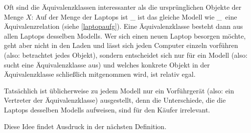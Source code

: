 \begin{bsp}
	Oft sind die Äquivalenzklassen interessanter als die ursprünglichen Objekte der Menge $X$: Auf der Menge der Laptops ist \glqq\_ ist das gleiche Modell wie \_\grqq\, eine Äquivalenzrelation (siehe \cref{laptopaufg}). Eine Äquivalenzklasse besteht dann aus allen Laptops desselben Modells. Wer sich einen neuen Laptop besorgen möchte, geht aber nicht in den Laden und lässt sich jeden Computer einzeln vorführen (also: betrachtet jedes Objekt), sondern entscheidet sich nur für ein Modell (also: sucht eine Äquivalenzklasse aus) und welches konkrete Objekt in der Äquivalenzklasse schließlich mitgenommen wird, ist relativ egal.
	
	Tatsächlich ist üblicherweise zu jedem Modell nur ein Vorführgerät (also: ein Vertreter der Äquivalenzklasse) ausgestellt, denn die Unterschiede, die die Laptops desselben Modells aufweisen, sind für den Käufer irrelevant.
	
	Diese Idee findet Ausdruck in der nächsten Definition.
\end{bsp}





